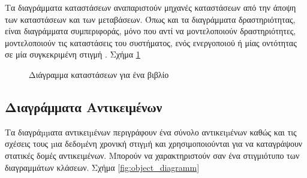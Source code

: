 \documentclass{assignment}
\begin{document}
Τα διαγράμματα καταστάσεων αναπαριστούν μηχανές καταστάσεων από την άποψη των καταστάσεων και των μεταβάσεων. Όπως και τα διαγράμματα δραστηριότητας, είναι διαγράμματα συμπεριφοράς, μόνο που αντί να μοντελοποιούν δραστηριότητες, μοντελοποιούν τις καταστάσεις του συστήματος, ενός ενεργοποιού ή μίας οντότητας σε μία συγκεκριμένη στιγμή \cite{virvou_uml,wazlawick2014object}. Σχήμα \ref{fig:statechart_diagram_book}










\begin{figure}
\begin{center}
\caption{Διάγραμμα καταστάσεων για ένα βιβλίο} 
\label{fig:statechart_diagram_book}
\end{center}
\end{figure}







\subsection{Διαγράμματα Αντικειμένων}

Τα διαγράµµατα αντικειµένων περιγράφουν ένα σύνολο αντικειµένων καθώς και τις σχέσεις τους µια δεδοµένη χρονική στιγµή και χρησιμοποιούνται για να καταγράψουν στατικές δομές αντικειμένων. Μπορούν να χαρακτηριστούν σαν ένα στιγμιότυπο των διαγραμμάτων κλάσεων. Σχήμα \ref{fig:object_diagramm}
\end{document}
